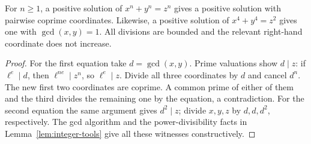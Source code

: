 \begin{lemma}\label{lem:primitive}
For $n\geq1$, a positive solution of $x^n+y^n=z^n$ gives a positive
solution with pairwise coprime coordinates. Likewise, a positive solution
of $x^4+y^4=z^2$ gives one with $\gcd(x,y)=1$.
All divisions are bounded and the relevant right-hand coordinate does not
increase.
\end{lemma}

\begin{proof}
For the first equation take $d=\gcd(x,y)$. Prime valuations show
$d\mid z$: if $\ell^e\mid d$, then $\ell^{ne}\mid z^n$, so
$\ell^e\mid z$. Divide all three coordinates by $d$ and cancel $d^n$.
The new first two coordinates are coprime. A common prime of either of
them and the third divides the remaining one by the equation, a
contradiction. For the second equation the same argument gives
$d^2\mid z$; divide $x,y,z$ by $d,d,d^2$, respectively. The gcd algorithm
and the power-divisibility facts in Lemma~\ref{lem:integer-tools} give all
these witnesses constructively.
\end{proof}

